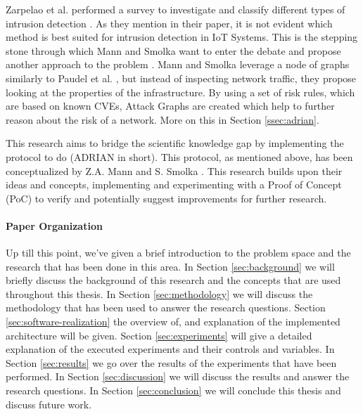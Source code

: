 Zarpelao et al. performed a survey to investigate and classify different types of intrusion detection \cite{zarpelao2017survey}. As they mention in their paper, it is not evident which method is best suited for intrusion detection in IoT Systems. This is the stepping stone through which Mann and Smolka want to enter the debate and propose another approach to the problem \cite{mann2023ADRIAN}. 
Mann and Smolka leverage a node of graphs similarly to Paudel et al. \cite{paudel2019detecting}, but instead of inspecting network traffic, they propose looking at the properties of the infrastructure. By using a set of risk rules, which are based on known CVEs, Attack Graphs are created which help to further reason about the risk of a network. More on this in Section \ref{ssec:adrian}.

This research aims to bridge the scientific knowledge gap by implementing the protocol to do \ADRIAN (ADRIAN in short). This protocol, as mentioned above, has been conceptualized by Z.A. Mann and S. Smolka \cite{mann2023ADRIAN}. This research builds upon their ideas and concepts, implementing and experimenting with a Proof of Concept (PoC) to verify and potentially suggest improvements for further research. 


\paragraph{Paper Organization}
Up till this point, we've given a brief introduction to the problem space and the research that has been done in this area. In Section \ref{sec:background} we will briefly discuss the background of this research and the concepts that are used throughout this thesis. In Section \ref{sec:methodology} we will discuss the methodology that has been used to answer the research questions. Section \ref{sec:software-realization} the overview of, and explanation of the implemented architecture will be given. Section \ref{sec:experiments} will give a detailed explanation of the executed experiments and their controls and variables. In Section \ref{sec:results} we go over the results of the experiments that have been performed. In Section \ref{sec:discussion} we will discuss the results and answer the research questions. In Section \ref{sec:conclusion} we will conclude this thesis and discuss future work.
